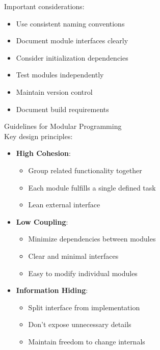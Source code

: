 \begin{remark}
Important considerations:
\begin{itemize}
  \item Use consistent naming conventions
  \item Document module interfaces clearly
  \item Consider initialization dependencies
  \item Test modules independently
  \item Maintain version control
  \item Document build requirements
\end{itemize}
\end{remark}

\begin{concept}{Guidelines for Modular Programming}\\
Key design principles:
\begin{itemize}
  \item \textbf{High Cohesion}:
    \begin{itemize}
      \item Group related functionality together
      \item Each module fulfills a single defined task
      \item Lean external interface
    \end{itemize}
  \item \textbf{Low Coupling}:
    \begin{itemize}
      \item Minimize dependencies between modules
      \item Clear and minimal interfaces
      \item Easy to modify individual modules
    \end{itemize}
  \item \textbf{Information Hiding}:
    \begin{itemize}
      \item Split interface from implementation
      \item Don't expose unnecessary details
      \item Maintain freedom to change internals
    \end{itemize}
\end{itemize}
\end{concept}


